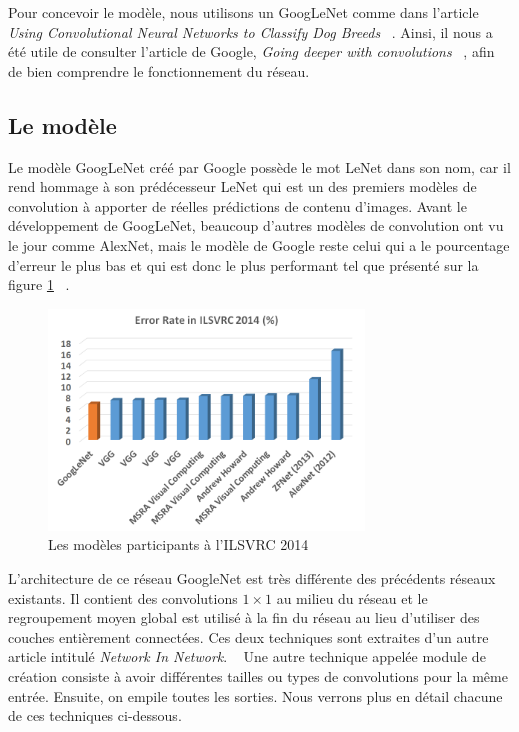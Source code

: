 \documentclass{article}
\begin{document}
Pour concevoir le modèle, nous utilisons un GoogLeNet comme dans l'article 
\textit{Using Convolutional Neural Networks to Classify Dog Breeds} 
~\cite{output}. Ainsi, il nous a été utile de consulter l'article de Google,
\textit{Going deeper with convolutions} ~\cite{43022}, afin de bien comprendre
le fonctionnement du réseau.

\subsection{Le modèle}
Le modèle GoogLeNet créé par Google possède le mot LeNet dans son nom, car il
rend hommage à son prédécesseur LeNet qui est un des premiers modèles de
convolution à apporter de réelles prédictions de contenu d’images. Avant le
développement de GoogLeNet,  beaucoup d’autres modèles de convolution ont vu le
jour comme AlexNet, mais le modèle de Google reste celui qui a le pourcentage
d’erreur le plus bas et qui est donc le plus performant tel que présenté
sur la figure \ref{2} ~\cite{tsang_2018}.

\begin{figure}[htbp]
    \includegraphics[width=8.4cm]{./figures/Figure1.png} 
    \caption{Les modèles participants à l'ILSVRC 2014}
    \label{2} 
\end{figure} 

L'architecture de ce réseau GoogleNet est très différente des précédents réseaux
existants. Il contient des convolutions $1\times 1$ au milieu du réseau et le
regroupement moyen global est utilisé à la fin du réseau au lieu d’utiliser des
couches entièrement connectées. Ces deux techniques sont extraites d’un autre
article intitulé \textit{Network In Network}. ~\cite{lin2013network} Une autre
technique appelée module de création consiste à avoir différentes tailles ou
types de convolutions pour la même entrée. Ensuite, on empile toutes les 
sorties. Nous verrons plus en détail chacune de ces techniques ci-dessous.
\end{document}
